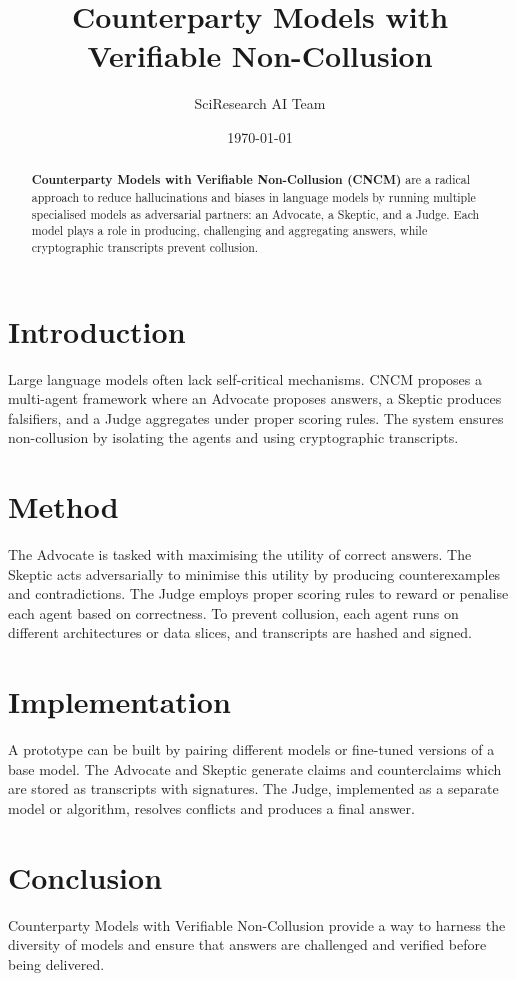 \documentclass{article}
\title{Counterparty Models with Verifiable Non-Collusion}
\author{SciResearch AI Team}
\date{\today}
\begin{document}
\maketitle
\begin{abstract}
\textbf{Counterparty Models with Verifiable Non-Collusion (CNCM)} are a radical approach to reduce hallucinations and biases in language models by running multiple specialised models as adversarial partners: an Advocate, a Skeptic, and a Judge. Each model plays a role in producing, challenging and aggregating answers, while cryptographic transcripts prevent collusion.
\end{abstract}
\section{Introduction}
Large language models often lack self-critical mechanisms. CNCM proposes a multi-agent framework where an Advocate proposes answers, a Skeptic produces falsifiers, and a Judge aggregates under proper scoring rules. The system ensures non-collusion by isolating the agents and using cryptographic transcripts.
\section{Method}
The Advocate is tasked with maximising the utility of correct answers. The Skeptic acts adversarially to minimise this utility by producing counterexamples and contradictions. The Judge employs proper scoring rules to reward or penalise each agent based on correctness. To prevent collusion, each agent runs on different architectures or data slices, and transcripts are hashed and signed.
\section{Implementation}
A prototype can be built by pairing different models or fine-tuned versions of a base model. The Advocate and Skeptic generate claims and counterclaims which are stored as transcripts with signatures. The Judge, implemented as a separate model or algorithm, resolves conflicts and produces a final answer.
\section{Conclusion}
Counterparty Models with Verifiable Non-Collusion provide a way to harness the diversity of models and ensure that answers are challenged and verified before being delivered.
\end{document}
